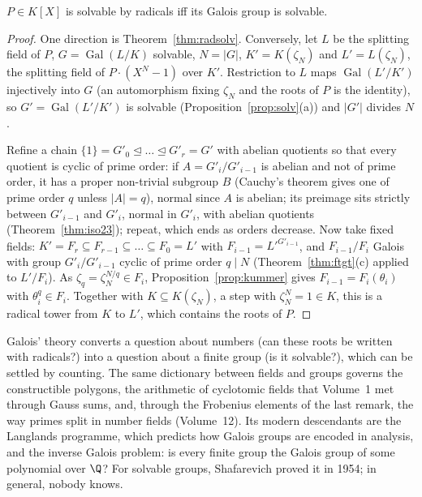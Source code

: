 \begin{theorem}\label{thm:galoiscrit}
$P\in K[X]$ is solvable by radicals iff its Galois group is solvable.
\end{theorem}
\begin{proof}
One direction is Theorem~\ref{thm:radsolv}. Conversely, let $L$ be the splitting field of $P$, $G=\operatorname{Gal}(L/K)$ solvable, $N=|G|$, $K'=K(\zeta_N)$ and $L'=L(\zeta_N)$, the splitting field of $P\cdot(X^N-1)$ over $K'$. Restriction to $L$ maps $\operatorname{Gal}(L'/K')$ injectively into $G$ (an automorphism fixing $\zeta_N$ and the roots of $P$ is the identity), so $G'=\operatorname{Gal}(L'/K')$ is solvable (Proposition~\ref{prop:solv}(a)) and $|G'|$ divides $N$.

Refine a chain $\{1\}=G'_0\trianglelefteq\dots\trianglelefteq G'_r=G'$ with abelian quotients so that every quotient is cyclic of prime order: if $A=G'_i/G'_{i-1}$ is abelian and not of prime order, it has a proper non-trivial subgroup $B$ (Cauchy's theorem gives one of prime order $q$ unless $|A|=q$), normal since $A$ is abelian; its preimage sits strictly between $G'_{i-1}$ and $G'_i$, normal in $G'_i$, with abelian quotients (Theorem~\ref{thm:iso23}); repeat, which ends as orders decrease. Now take fixed fields: $K'=F_r\subseteq F_{r-1}\subseteq\dots\subseteq F_0=L'$ with $F_{i-1}=L'^{G'_{i-1}}$, and $F_{i-1}/F_i$ Galois with group $G'_i/G'_{i-1}$ cyclic of prime order $q\mid N$ (Theorem~\ref{thm:ftgt}(c) applied to $L'/F_i$). As $\zeta_q=\zeta_N^{N/q}\in F_i$, Proposition~\ref{prop:kummer} gives $F_{i-1}=F_i(\theta_i)$ with $\theta_i^q\in F_i$. Together with $K\subseteq K(\zeta_N)$, a step with $\zeta_N^N=1\in K$, this is a radical tower from $K$ to $L'$, which contains the roots of $P$.
\end{proof}

\begin{beauty}
Galois' theory converts a question about numbers (can these roots be written with radicals?) into a question about a finite group (is it solvable?), which can be settled by counting. The same dictionary between fields and groups governs the constructible polygons, the arithmetic of cyclotomic fields that Volume~1 met through Gauss sums, and, through the Frobenius elements of the last remark, the way primes split in number fields (Volume~12). Its modern descendants are the Langlands programme, which predicts how Galois groups are encoded in analysis, and the inverse Galois problem: is every finite group the Galois group of some polynomial over $\Q$? For solvable groups, Shafarevich proved it in 1954; in general, nobody knows.
\end{beauty}

